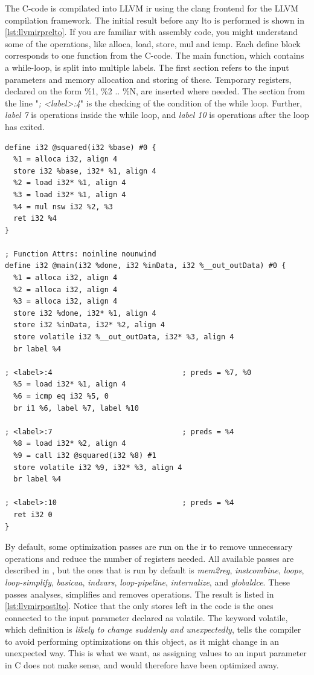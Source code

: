 The C-code is compilated into LLVM \gls{ir} using the clang frontend for the LLVM compilation framework. The initial result before any \gls{lto} is performed is shown in \cref{lst:llvmirprelto}. If you are familiar with assembly code, you might understand some of the operations, like alloca, load, store, mul and icmp. Each define block corresponds to one function from the C-code. The main function, which contains a while-loop, is split into multiple labels. The first section refers to the input parameters and memory allocation and storing of these. Temporary registers, declared on the form \%1, \%2 .. \%N, are inserted where needed. The section from the line "\textit{; <label>:4}" is the checking of the condition of the while loop. Further, \textit{label 7} is operations inside the while loop, and \textit{label 10} is operations after the loop has exited.
\lstset{language=llvm,style=LLVMstyle}
\begin{lstlisting}[caption={LLVM IR before LTO},label=lst:llvmirprelto]
define i32 @squared(i32 %base) #0 {
  %1 = alloca i32, align 4
  store i32 %base, i32* %1, align 4
  %2 = load i32* %1, align 4
  %3 = load i32* %1, align 4
  %4 = mul nsw i32 %2, %3
  ret i32 %4
}

; Function Attrs: noinline nounwind
define i32 @main(i32 %done, i32 %inData, i32 %__out_outData) #0 {
  %1 = alloca i32, align 4
  %2 = alloca i32, align 4
  %3 = alloca i32, align 4
  store i32 %done, i32* %1, align 4
  store i32 %inData, i32* %2, align 4
  store volatile i32 %__out_outData, i32* %3, align 4
  br label %4

; <label>:4                              ; preds = %7, %0
  %5 = load i32* %1, align 4
  %6 = icmp eq i32 %5, 0
  br i1 %6, label %7, label %10

; <label>:7                              ; preds = %4
  %8 = load i32* %2, align 4
  %9 = call i32 @squared(i32 %8) #1
  store volatile i32 %9, i32* %3, align 4
  br label %4

; <label>:10                             ; preds = %4
  ret i32 0
}
\end{lstlisting}
By default, some optimization passes are run on the \gls{ir} to remove unnecessary operations and reduce the number of registers needed. All available passes are described in \cite{llvmpasses}, but the ones that is run by default is \textit{mem2reg}, \textit{instcombine}, \textit{loops}, \textit{loop-simplify}, \textit{basicaa}, \textit{indvars}, \textit{loop-pipeline}, \textit{internalize}, and \textit{globaldce}. These passes analyses, simplifies and removes operations. The result is listed in \cref{lst:llvmirpostlto}. Notice that the only stores left in the code is the ones connected to the input parameter declared as volatile. The keyword volatile, which definition is \textit{likely to change suddenly and unexpectedly}, tells the compiler to avoid performing optimizations on this object, as it might change in an unexpected way. This is what we want, as assigning values to an input parameter in C does not make sense, and would therefore have been optimized away. 

